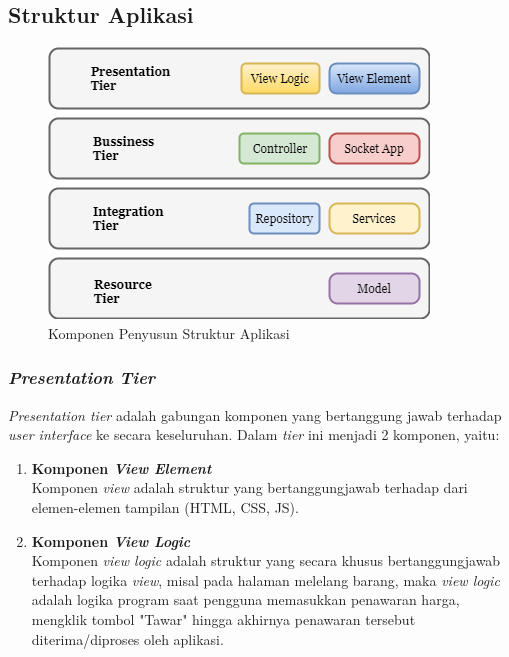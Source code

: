 
\subsection{Struktur Aplikasi}
\label{software-structure}

	\begin{figure}[H]
		\centering
		\includegraphics[width=.7\textwidth]{images/bab3/apl/main-apl.png}
		\caption{Komponen Penyusun Struktur Aplikasi}
		\label{software-structure-img}
	\end{figure}
	
	\subsubsection{\textit{Presentation Tier}}
		\textit{Presentation tier} adalah gabungan komponen yang bertanggung jawab terhadap \textit{user interface} ke secara keseluruhan. Dalam \textit{tier} ini  menjadi 2 komponen, yaitu:
		\begin{enumerate}
			\item \textbf{Komponen \textit{View Element}} \\
			Komponen \textit{view} adalah struktur yang bertanggungjawab terhadap dari elemen-elemen tampilan (HTML, CSS, JS).
			\item \textbf{Komponen \textit{View Logic}} \\
			Komponen \textit{view logic} adalah struktur yang secara khusus bertanggungjawab terhadap logika \textit{view}, misal pada halaman melelang barang, maka \textit{view logic} adalah logika program saat pengguna memasukkan penawaran harga, mengklik tombol "Tawar" hingga akhirnya penawaran tersebut diterima/diproses oleh aplikasi.
		\end{enumerate}
		
		
